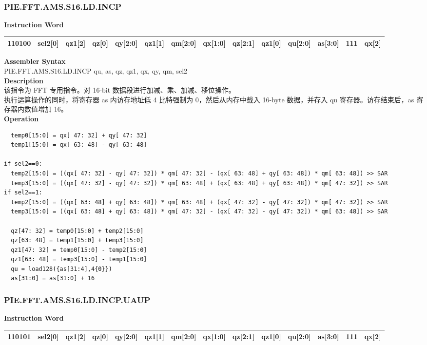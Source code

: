 \newpage
\subsubsection{PIE.FFT.AMS.S16.LD.INCP}\label{instruction:PIEFFTAMSS16LDINCP}
\setlength\tabcolsep{5pt}
\textbf{Instruction Word} \\
\begin{tabular}{|c|c|c|c|c|c|c|c|c|c|c|c|c|c|}
	\hline
	110100 & sel2[0] & qz1[2] & qz[0] & qy[2:0] & qz1[1] & qm[2:0] & qx[1:0] & qz[2:1] & qz1[0] & qu[2:0] & as[3:0] & 111 & qx[2] \\
	\hline
\end{tabular}

\textbf{Assembler Syntax} \\
PIE.FFT.AMS.S16.LD.INCP qu, as, qz, qz1, qx, qy, qm, sel2 \\
\textbf{Description} \\
该指令为 FFT 专用指令。对 16-bit 数据段进行加减、乘、加减、移位操作。\\
执行运算操作的同时，将寄存器 as 内访存地址低 4 比特强制为 0，然后从内存中载入 16-byte 数据，并存入 qu 寄存器。访存结束后，as 寄存器内数值增加 16。\\
\textbf{Operation}
\begin{lstlisting}
  temp0[15:0] = qx[ 47: 32] + qy[ 47: 32]
  temp1[15:0] = qx[ 63: 48] - qy[ 63: 48]

if sel2==0:
  temp2[15:0] = ((qx[ 47: 32] - qy[ 47: 32]) * qm[ 47: 32] - (qx[ 63: 48] + qy[ 63: 48]) * qm[ 63: 48]) >> SAR
  temp3[15:0] = ((qx[ 47: 32] - qy[ 47: 32]) * qm[ 63: 48] + (qx[ 63: 48] + qy[ 63: 48]) * qm[ 47: 32]) >> SAR
if sel2==1:
  temp2[15:0] = ((qx[ 63: 48] + qy[ 63: 48]) * qm[ 63: 48] + (qx[ 47: 32] - qy[ 47: 32]) * qm[ 47: 32]) >> SAR
  temp3[15:0] = ((qx[ 63: 48] + qy[ 63: 48]) * qm[ 47: 32] - (qx[ 47: 32] - qy[ 47: 32]) * qm[ 63: 48]) >> SAR

  qz[47: 32] = temp0[15:0] + temp2[15:0]
  qz[63: 48] = temp1[15:0] + temp3[15:0]
  qz1[47: 32] = temp0[15:0] - temp2[15:0]
  qz1[63: 48] = temp3[15:0] - temp1[15:0]
  qu = load128({as[31:4],4{0}})
  as[31:0] = as[31:0] + 16
\end{lstlisting}

\newpage
\subsubsection{PIE.FFT.AMS.S16.LD.INCP.UAUP}\label{instruction:PIEFFTAMSS16LDINCPUAUP}
\setlength\tabcolsep{5pt}
\textbf{Instruction Word} \\
\begin{tabular}{|c|c|c|c|c|c|c|c|c|c|c|c|c|c|}
	\hline
	110101 & sel2[0] & qz1[2] & qz[0] & qy[2:0] & qz1[1] & qm[2:0] & qx[1:0] & qz[2:1] & qz1[0] & qu[2:0] & as[3:0] & 111 & qx[2] \\
	\hline
\end{tabular}

